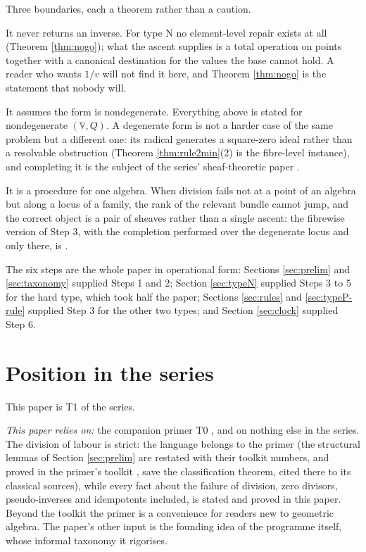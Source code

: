 \begin{remark}\label{rem:notdo}
Three boundaries, each a theorem rather than a caution.

It never returns an inverse. For type N no element-level repair exists at all (Theorem \ref{thm:nogo}); what the ascent supplies is a total operation on points together with a canonical destination for the values the base cannot hold. A reader who wants $1/v$ will not find it here, and Theorem \ref{thm:nogo} is the statement that nobody will.

It assumes the form is nondegenerate. Everything above is stated for nondegenerate $(\mathbb{V},Q)$. A degenerate form is not a harder case of the same problem but a different one: its radical generates a square-zero ideal rather than a resolvable obstruction (Theorem \ref{thm:rule2min}(2) is the fibre-level instance), and completing it is the subject of the series' sheaf-theoretic paper \cite{ButlerT4}.

It is a procedure for one algebra. When division fails not at a point of an algebra but along a locus of a family, the rank of the relevant bundle cannot jump, and the correct object is a pair of sheaves rather than a single ascent: the fibrewise version of Step 3, with the completion performed over the degenerate locus and only there, is \cite[Thm.\ 4.4, Cor.\ 4.5]{ButlerT4}.
\end{remark}


The six steps are the whole paper in operational form: Sections \ref{sec:prelim} and \ref{sec:taxonomy} supplied Steps 1 and 2; Section \ref{sec:typeN} supplied Steps 3 to 5 for the hard type, which took half the paper; Sections \ref{sec:rules} and \ref{sec:typeP-rule} supplied Step 3 for the other two types; and Section \ref{sec:clock} supplied Step 6.

\section{Position in the series}\label{sec:position}

This paper is T1 of the series.

\emph{This paper relies on:} the companion primer T0 \cite{ButlerT0}, and on nothing else in the series. The division of labour is strict: the language belongs to the primer (the structural lemmas of Section \ref{sec:prelim} are restated with their toolkit numbers, and proved in the primer's toolkit \cite[Section 9]{ButlerT0}, save the classification theorem, cited there to its classical sources), while every fact about the failure of division, zero divisors, pseudo-inverses and idempotents included, is stated and proved in this paper. Beyond the toolkit the primer is a convenience for readers new to geometric algebra. The paper's other input is the founding idea of the programme itself, whose informal taxonomy it rigorises.


